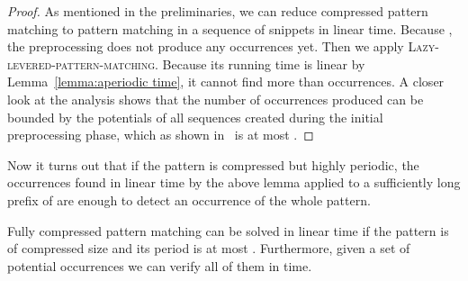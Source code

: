 \documentclass[runningheads]{llncs}
\newcommand{\proc}[1]{\textnormal{\scshape#1}}
\begin{document}
\begin{proof}
As mentioned in the preliminaries, we can reduce compressed pattern matching to pattern matching in a sequence of snippets in linear time.
Because , the preprocessing does not produce any occurrences yet. Then we apply \proc{Lazy-levered-pattern-matching}. Because its
running time is linear by Lemma~\ref{lemma:aperiodic time}, it cannot find more than  occurrences. A closer look
at the analysis shows that the number of occurrences produced can be bounded by the potentials of all sequences created during
the initial preprocessing phase, which as shown in~\cite{GawrychowskiLZW} is at most .
\end{proof}

Now it turns out that if the pattern is compressed but highly periodic, the occurrences found in linear time by the above lemma applied to
a sufficiently long prefix of  are enough to detect an occurrence of the whole pattern.

\begin{lemma}
\label{lemma:periodic}
Fully compressed pattern matching can be solved in linear time if the pattern is of compressed size  and its period is at most . Furthermore, given a set of  potential occurrences we can verify all of them in  time.
\end{lemma}
\end{document}
